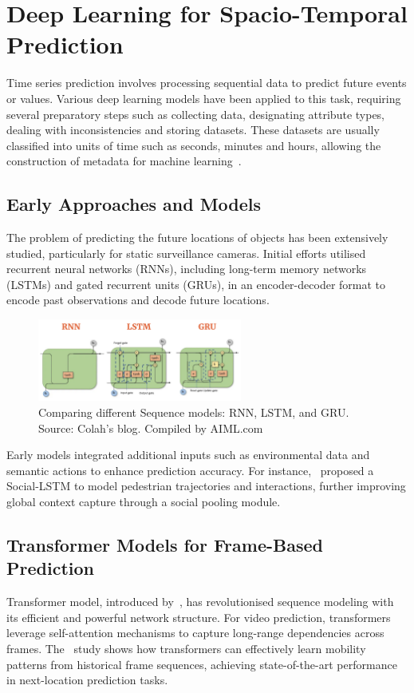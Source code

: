 \documentclass[12pt,oneside]{book} %
\begin{document}
\section{Deep Learning for Spacio-Temporal Prediction}
Time series prediction involves processing sequential data to predict future
events or values. Various deep learning models have been applied to this task,
requiring several preparatory steps such as collecting data, designating
attribute types, dealing with inconsistencies and storing datasets. These
datasets are usually classified into units of time such as seconds, minutes and
hours, allowing the construction of metadata for machine
learning~\cite{FFPSpaceSystemVehicles}.

\subsection*{Early Approaches and Models}
The problem of predicting the future locations of objects has been extensively
studied, particularly for static surveillance cameras. Initial efforts utilised
recurrent neural networks (RNNs), including long-term memory networks (LSTMs)
and gated recurrent units (GRUs), in an encoder-decoder format to encode past
observations and decode future locations. 

\begin{figure}[H]
    \centering
    \includegraphics[width=0.6\textwidth]{figures/lstm-rnn-gru.png}
    \caption{Comparing different Sequence models: RNN, LSTM, and GRU. Source: Colah's blog. Compiled by AIML.com}\label{fig:lstm-rnn-gru}
\end{figure}

Early models integrated additional inputs such as environmental data and
semantic actions to enhance prediction accuracy. For
instance,~\citet{Alahi2016} proposed a Social-LSTM to model pedestrian
trajectories and interactions, further improving global context capture through
a social pooling module.

\subsection*{Transformer Models for Frame-Based Prediction}
Transformer model, introduced by~\citet{Vaswani2017}, has revolutionised
sequence modeling with its efficient and powerful network structure. For video
prediction, transformers leverage self-attention mechanisms to capture
long-range dependencies across frames. The~\citet{HowDoUGoWhere} study shows
how transformers can effectively learn mobility patterns from historical frame
sequences, achieving state-of-the-art performance in next-location prediction
tasks.
\end{document}
